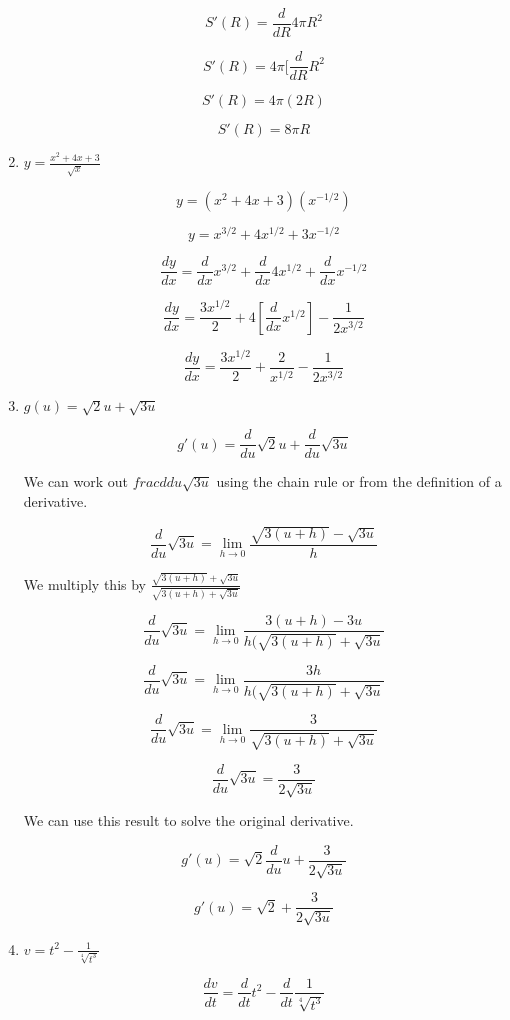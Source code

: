 \documentclass{article}
\begin{document}
\begin{enumerate}
			$$S'(R) = \frac{d}{dR} 4 \pi R^2$$

			$$S'(R) = 4 \pi [\frac{d}{dR} R^2$$

			$$S'(R) = 4 \pi (2R)$$

			$$S'(R) = 8 \pi R$$

		\item $y = \frac{x^2 + 4x + 3}{\sqrt{x}}$

			$$y = (x^2 + 4x + 3)(x^{-1/2})$$

			$$y = x^{3/2} + 4x^{1/2} + 3x^{-1/2}$$

			$$\frac{dy}{dx} = \frac{d}{dx} x^{3/2} + \frac{d}{dx} 4x^{1/2} + \frac{d}{dx} x^{-1/2}$$

			$$\frac{dy}{dx} = \frac{3x^{1/2}}{2} + 4 [\frac{d}{dx} x^{1/2}] - \frac{1}{2x^{3/2}}$$

			$$\frac{dy}{dx} = \frac{3x^{1/2}}{2} + \frac{2}{x^{1/2}} - \frac{1}{2x^{3/2}}$$

		\item $g(u) = \sqrt{2}u + \sqrt{3u}$

			$$g'(u) = \frac{d}{du} \sqrt{2}u + \frac{d}{du} \sqrt{3u}$$

			We can work out $frac{d}{du} \sqrt{3u}$ using the chain rule or from the 
			definition of a derivative.

			$$\frac{d}{du} \sqrt{3u} = \lim \limits _{h \to 0} \frac{\sqrt{3(u+h)} - \sqrt{3u}}{h}$$

			We multiply this by $\frac{\sqrt{3(u+h)} + \sqrt{3u}}{\sqrt{3(u+h) + \sqrt{3u}}}$

			$$\frac{d}{du} \sqrt{3u} = \lim \limits _{h \to 0} \frac{3(u+h) - 3u}{h(\sqrt{3(u+h)} + \sqrt{3u}}$$

			$$\frac{d}{du} \sqrt{3u} = \lim \limits _{h \to 0} \frac{3h}{h(\sqrt{3(u+h)} + \sqrt{3u}}$$
			
			$$\frac{d}{du} \sqrt{3u} = \lim \limits _{h \to 0} \frac{3}{\sqrt{3(u+h)} + \sqrt{3u}}$$

			$$\frac{d}{du} \sqrt{3u} = \frac{3}{2\sqrt{3u}}$$

			We can use this result to solve the original derivative.

			$$g'(u) = \sqrt{2} \frac{d}{du} u + \frac{3}{2\sqrt{3u}}$$
			
			$$g'(u) = \sqrt{2} + \frac{3}{2\sqrt{3u}}$$

		\item $v = t^2 - \frac{1}{\sqrt[4]{t^3}}$

			$$\frac{dv}{dt} = \frac{d}{dt} t^2 - \frac{d}{dt} \frac{1}{\sqrt[4]{t^3}}$$


\end{enumerate}
\end{document}
